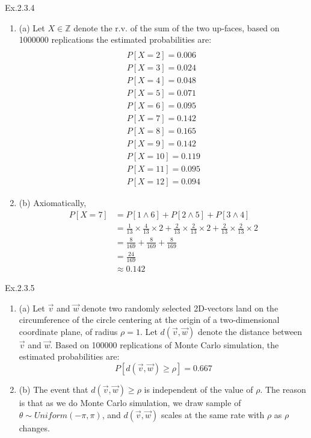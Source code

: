 \documentclass[11pt]{article}
\theoremstyle{definition}
\begin{document}
\begin{enumerate}[leftmargin=0pt, itemsep=3ex]
    \problemitem Ex.2.3.4
        \begin{enumerate}
        \item (a)
        Let $X \in \mathbb{Z}$ denote the r.v. of the sum of the two up-faces,
        based on 1000000 replications the estimated probabilities are:
        \begin{align*}
        \\P[X=2] = 0.006
        \\P[X=3] = 0.024
        \\P[X=4] = 0.048
        \\P[X=5] = 0.071
        \\P[X=6] = 0.095
        \\P[X=7] = 0.142
        \\P[X=8] = 0.165
        \\P[X=9] = 0.142
        \\P[X=10] = 0.119
        \\P[X=11] = 0.095
        \\P[X=12] = 0.094
        \end{align*}
        \item (b) Axiomatically,
        \begin{align*}
            P[X=7] &= P[1 \land 6]+P[2 \land 5]+P[3 \land 4]
             \\ &= \frac{1}{13}\times \frac{4}{13} \times 2 + \frac{2}{13}\times \frac{2}{13} \times 2 + \frac{2}{13}\times \frac{2}{13} \times 2 
             \\ &= \frac{8}{169} + \frac{8}{169} + \frac{8}{169}
             \\ &= \frac{24}{169}
             \\ & \approx 0.142
        \end{align*}
        \end{enumerate}

    \problemitem Ex.2.3.5
    
        \begin{enumerate}
            \item (a) Let $\overrightarrow{v}$ and $\overrightarrow{w}$ denote two randomly selected 2D-vectors land on the circumference of the circle centering at the origin of a two-dimensional coordinate plane, of radius $\rho = 1$.
            Let $d(\overrightarrow{v},\overrightarrow{w})$ denote the distance between $\overrightarrow{v}$ and $\overrightarrow{w}$.
    Based on 100000 replications of Monte Carlo simulation, the estimated probabilities are:
    $$P[d(\overrightarrow{v},\overrightarrow{w}) \geqslant \rho] = 0.667$$
    \item (b) The event that $d(\overrightarrow{v},\overrightarrow{w}) \geqslant \rho$ is independent of the value of $\rho$. The reason is that as we do Monte Carlo simulation, we draw sample of $\theta \sim Uniform(-\pi, \pi)$, and $d(\overrightarrow{v},\overrightarrow{w})$ scales 
    at the same rate with $\rho$ as $\rho$ changes. 
    
        \end{enumerate}
        
\end{enumerate}
\end{document}
